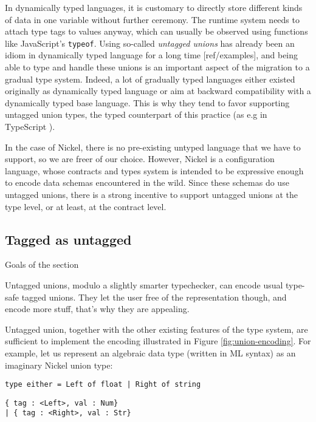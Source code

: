 In dynamically typed languages, it is customary to directly store different kinds
of data in one variable without further ceremony. The runtime system needs to
attach type tags to values anyway, which can usually be observed using functions
like JavaScript's \verb+typeof+. Using so-called \emph{untagged
  unions} has
already been an idiom in dynamically typed language for a long time
[ref/examples], and being able to type and handle these unions is an important
aspect of the migration to a gradual type system. Indeed, a lot of gradually
typed languages either existed originally as dynamically typed language or aim
at backward compatibility with a dynamically typed base language. This is why
they tend to favor supporting untagged union types, the typed counterpart of
this practice (as e.g in TypeScript \cite{TypeScriptUnions}).

In the case of Nickel, there is no pre-existing untyped language that we have to
support, so we are freer of our choice. However, Nickel is a configuration
language, whose contracts and types system is intended to be expressive enough
to encode data schemas encountered in the wild. Since these schemas do use
untagged unions, there is a strong incentive to support untagged unions at the
type level, or at least, at the contract level.

\subsection{Tagged as untagged}
{\color{red}Goals of the section

Untagged unions, modulo a slightly smarter typechecker, can encode usual type-safe
tagged unions. They let the user free of the representation though, and encode
more stuff, that's why they are appealing.\vspace{0.5cm}}

Untagged union, together with the other existing features of the type system,
are sufficient to implement the encoding illustrated in Figure
\ref{fig:union-encoding}. For example, let us represent an algebraic data type
(written in ML syntax) as an imaginary Nickel union type:

\begin{lstlisting}[language=caml]
type either = Left of float | Right of string
\end{lstlisting}

\begin{lstlisting}[language=nickel]
{ tag : <Left>, val : Num}
| { tag : <Right>, val : Str}
\end{lstlisting}

